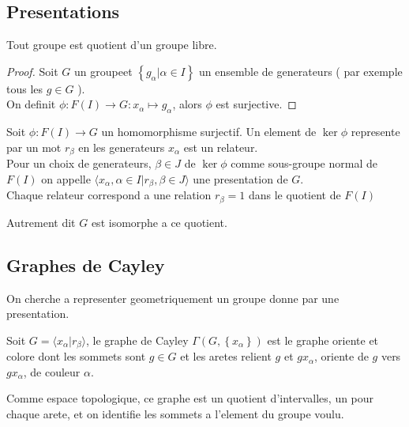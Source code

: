 \documentclass[../main.tex]{subfiles}
\begin{document}
\subsection{Presentations}
\begin{lemma}
Tout groupe est quotient d'un groupe libre.
\end{lemma}
\begin{proof}
Soit $G$ un groupeet $ \left\{ g_\alpha  | \alpha\in I\right\} $ un ensemble de generateurs ( par exemple tous les $g\in G$ ).\\
On definit $\phi: F( I) \to G: x_\alpha\mapsto g_\alpha$, alors $\phi$ est surjective.
\end{proof}
\begin{defn}
	Soit $\phi: F( I) \to G$ un homomorphisme surjectif. Un element de $\ker\phi$ represente par un mot $r_\beta$ en les generateurs $x_\alpha$ est un relateur.\\
	Pour un choix de generateurs, $\beta\in J$ de $\ker\phi$ comme sous-groupe normal de $F( I) $ on appelle $ \langle x_\alpha, \alpha\in I | r_\beta, \beta \in J\rangle$ une presentation de $G$.\\
	Chaque relateur correspond a une relation $r_\beta=1$ dans le quotient de $F( I) $ 
\end{defn}
Autrement dit $G$ est isomorphe a ce quotient.
\subsection{Graphes de Cayley}
On cherche a representer geometriquement un groupe donne par une presentation.
\begin{defn}
	Soit $ G = \langle x_\alpha| r_\beta\rangle$, le graphe de Cayley $\Gamma ( G, \left\{ x_\alpha \right\} ) $ est le graphe oriente et colore dont les sommets sont $g\in G$ et les aretes relient $g$ et $gx_\alpha$, oriente de $g$ vers $gx_\alpha$, de couleur $\alpha$.
\end{defn}
\begin{rmq}
Comme espace topologique, ce graphe est un quotient d'intervalles, un pour chaque arete, et on identifie les sommets a l'element du groupe voulu.
\end{rmq}
\end{document}
